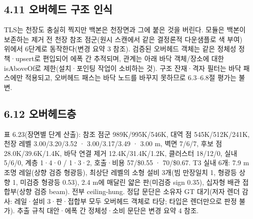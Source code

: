 \documentclass[11pt,a4paper]{article}
\begin{document}
\subsection*{4.11 오버헤드 구조 인식}
TLS는 천장도 충실히 찍지만 백본은 천장면과 그에 붙은 것을 버린다. 모듈은 백본이 보존하는 제거 전 천장 참조 점군(원시 스캔에서 같은 결정론적 다운샘플로 색 부여) 위에서 6단계로 동작한다(변경 요약 3 참조). 검증된 오버헤드 객체는 같은 정체성 정책·upsert로 편입되어 에폭 간 추적되며, 관계는 아래 바닥 객체/장소에 대한 isAboveOf로 제한(설치·포인팅 작업이 소비하는 것). 구조 잔재·격자 필터는 바닥 패스에만 적용되고, 오버헤드 패스는 바닥 노드를 바꾸지 못하므로 6.3--6.8절 평가는 불변.

\subsection*{6.12 오버헤드층}
표 6.23(장면별 단계 산출): 참조 점군 989K/995K/546K, 대역 점 545K/512K/241K, 천장 레벨 3.00/3.20/3.52 · 3.00/3.17/3.49 · 3.00 m, 벽면 7/6/7, 후보 점 28.0K/39.6K/1.4K, 바닥 연결 제거 12.4K/31.4K/1.2K, 클러스터 18/12/0, 실내 5/6/0, 계층 1·4·0 / 1·3·2, 호출·비용 57/\$0.55 · 70/\$0.67. T3 실내 6개: 7.9 m 조명 레일(상향 검증 형광등), 최상단 레벨의 소형 설비 3개(빔 만장일치 1, 형광등 상향 1, 미검증 형광등 0.53), 2.4 m에 매달린 얇은 판(미검증 sign 0.35), 십자형 배관 접합부(상향 검증 beam). 전부 ceiling-hung. 정답 문단은 소유자 GT 대기(저자 렌더 감사: 레일·설비 3·판·접합부 모두 오버헤드 객체로 타당; 타입은 렌더만으로 판정 불가). 추출 규칙 대안·에폭 간 정체성·소비 문단은 변경 요약 4 참조.
\end{document}
